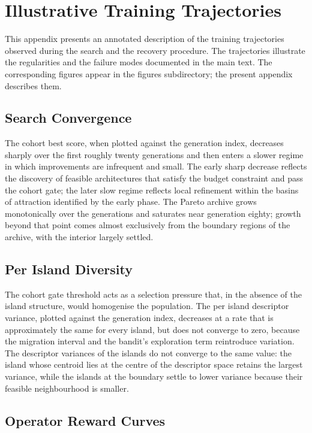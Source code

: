 \section{Illustrative Training Trajectories}
\label{app:curves}

This appendix presents an annotated description of the training trajectories observed during the search and the recovery procedure. The trajectories illustrate the regularities and the failure modes documented in the main text. The corresponding figures appear in the figures subdirectory; the present appendix describes them.

\subsection{Search Convergence}

The cohort best score, when plotted against the generation index, decreases sharply over the first roughly twenty generations and then enters a slower regime in which improvements are infrequent and small. The early sharp decrease reflects the discovery of feasible architectures that satisfy the budget constraint and pass the cohort gate; the later slow regime reflects local refinement within the basins of attraction identified by the early phase. The Pareto archive grows monotonically over the generations and saturates near generation eighty; growth beyond that point comes almost exclusively from the boundary regions of the archive, with the interior largely settled.

\subsection{Per Island Diversity}

The cohort gate threshold acts as a selection pressure that, in the absence of the island structure, would homogenise the population. The per island descriptor variance, plotted against the generation index, decreases at a rate that is approximately the same for every island, but does not converge to zero, because the migration interval and the bandit's exploration term reintroduce variation. The descriptor variances of the islands do not converge to the same value: the island whose centroid lies at the centre of the descriptor space retains the largest variance, while the islands at the boundary settle to lower variance because their feasible neighbourhood is smaller.

\subsection{Operator Reward Curves}

